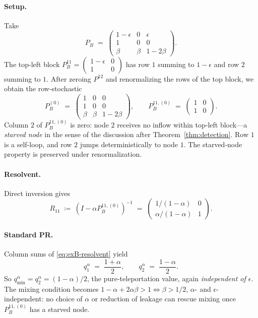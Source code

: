 \documentclass{article}
\theoremstyle{plain}
\theoremstyle{definition}
\newcommand{\arXivtag}[1][]{#1}
\begin{document}
\paragraph{Setup.} Take
\begin{equation}\label{eq:exB-K}
	P_B \;=\; \begin{pmatrix} 1-\epsilon & 0 & \epsilon \\ 1 & 0 & 0 \\ \beta & \beta & 1-2\beta \end{pmatrix}.
\end{equation}
The top-left block $P^{11}_B = \begin{pmatrix}1-\epsilon&0\\1&0\end{pmatrix}$ has row $1$ summing to $1-\epsilon$ and row $2$ summing to $1$. After zeroing $P^{12}$ and renormalizing \arXivtag[the rows of the top block,] we obtain the row-stochastic
	\begin{equation}\label{eq:exB-P0}
		P^{(0)}_B \;=\; \begin{pmatrix} 1 & 0 & 0 \\ 1 & 0 & 0 \\ \beta & \beta & 1-2\beta \end{pmatrix},
		\qquad
		P^{11,(0)}_B \;=\; \begin{pmatrix} 1 & 0 \\ 1 & 0 \end{pmatrix}.
	\end{equation}
	Column $2$ of $P^{11,(0)}_B$ is zero: node $2$ receives no inflow \arXivtag[within top-left block]---a \emph{starved node} in the sense of the discussion after Theorem~\ref{thm:detection}. Row $1$ is a self-loop, and row $2$ jumps deterministically to node $1$. The starved-node property is preserved under renormalization.

\paragraph{Resolvent.} Direct inversion gives
	\begin{equation}\label{eq:exB-resolvent}
		R_{11} \;\coloneqq\; (I - \alpha P^{11,(0)}_B)^{-1} \;=\; \begin{pmatrix} 1/(1-\alpha) & 0 \\ \alpha/(1-\alpha) & 1 \end{pmatrix}.
\end{equation}

\paragraph{Standard PR.} Column sums of \eqref{eq:exB-resolvent} yield
	\[
	q_1^\alpha \;=\; \frac{1+\alpha}{2}, \qquad q_2^\alpha \;=\; \frac{1-\alpha}{2}.
	\]
	So $q_{\min}^\alpha = q_2^\alpha = (1-\alpha)/2$, the pure-teleportation value, again \emph{independent of $\epsilon$}. The mixing condition becomes $1-\alpha+2\alpha\beta > 1 \Leftrightarrow \beta > 1/2$, $\alpha$- and $\epsilon$-independent: no choice of $\alpha$ or reduction of leakage can rescue mixing once $P^{11,(0)}_B$ has a starved node.
\end{document}
